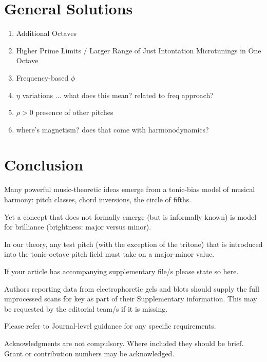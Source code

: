 \documentclass[sn-mathphys]{sn-jnl}%
\begin{document}
\section{General Solutions}\label{sec12}


\begin{enumerate}
  
\item Additional Octaves
\item Higher Prime Limits / Larger Range of Just Intontation Microtunings in One Octave
\item Frequency-based $\phi$
\item $\eta$ variations ... what does this mean? related to freq approach?
\item $\rho>0$ presence of other pitches
\item where's magnetism? does that come with harmonodynamics?
\end{enumerate}


\section{Conclusion}\label{sec13}

Many powerful music-theoretic ideas emerge from a tonic-bias model of musical harmony: pitch classes, chord inversions, the circle of fifths.

Yet a concept that does not formally emerge (but is informally known) is model for brilliance (brightness: major versus minor).

In our theory, any test pitch (with the exception of the tritone) that is introduced into the tonic-octave pitch field must take on a major-minor value. 

\backmatter


If your article has accompanying supplementary file/s please state so here. 

Authors reporting data from electrophoretic gels and blots should supply the full unprocessed scans for key as part of their Supplementary information. This may be requested by the editorial team/s if it is missing.

Please refer to Journal-level guidance for any specific requirements.


Acknowledgments are not compulsory. Where included they should be brief. Grant or contribution numbers may be acknowledged.
\end{document}
